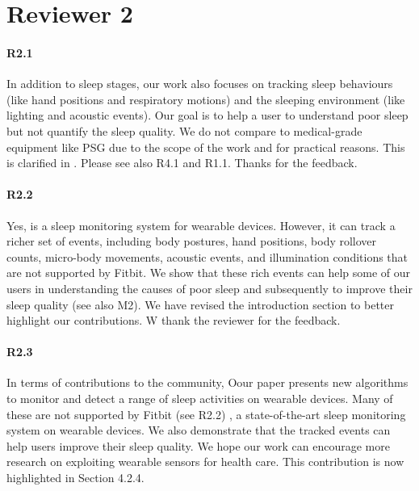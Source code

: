 \section*{Reviewer 2}
\paragraph{R2.1} In addition to sleep stages, our work also focuses on tracking sleep behaviours (like hand positions and respiratory motions) and the sleeping
environment (like lighting and acoustic events). Our goal is to help a user to understand poor sleep but not quantify the sleep quality. We
do not compare to medical-grade equipment like PSG due to the scope of the work and for practical reasons. This is clarified in
. Please see also R4.1 and R1.1. Thanks for the feedback.


\paragraph{R2.2} Yes, \systemname is a sleep monitoring system for wearable devices. However, it can track a richer set of events,
including body postures, hand positions, body rollover counts, micro-body movements, acoustic events, and illumination conditions that are
not supported by Fitbit. We show that these rich events can help some of our users in understanding the causes of poor sleep and
subsequently to improve their sleep quality (see also M2). We have revised the introduction section to better highlight our contributions.
W thank the reviewer for the feedback.

\paragraph{R2.3} In terms of contributions to the community, Oour paper presents new algorithms to monitor and detect a range of sleep
activities on wearable devices. Many of these are not supported by Fitbit (see R2.2) , a state-of-the-art sleep monitoring system on
wearable devices. We also demonstrate that the tracked events can help users improve their sleep quality. We hope our work can encourage
more research on exploiting wearable sensors for health care.   This contribution is now highlighted in Section 4.2.4.
